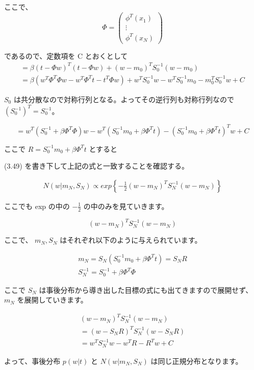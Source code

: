 \documentclass{jsarticle}
\begin{document}
ここで、
\[
    \Phi = \left( \begin{array}{c}
        \phi^T(x_1) \\
        \vdots\\
        \phi^T(x_N)
        \end{array} \right)
    \]

であるので、定数項を C とおくとして
\begin{align*}
    = \beta (t - \Phi w)^T(t - \Phi w) + (w - m_0)^TS_0^{-1}(w - m_0)\\
    = \beta ( w^T\Phi^T\Phi w - w^T\Phi^Tt - t^T\Phi w ) + w^TS_0^{-1}w - w^TS_0^{-1}m_0 - m_0^TS_0^{-1}w + C
\end{align*}

$S_0$ は共分散なので対称行列となる。よってその逆行列も対称行列なので $(S_0^{-1})^T = S_0^{-1}$。

\[
    = w^T(S_0^{-1} + \beta \Phi^T\Phi)w - w^T(S_0^{-1}m_0 + \beta \Phi^T t) - (S_0^{-1}m_0 + \beta \Phi^T t)^Tw + C
\]

ここで $R = S_0^{-1} m_0 + \beta \Phi^Tt$ とすると

(3.49) を書き下して上記の式と一致することを確認する。

\begin{align*}
    N(w|m_N, S_N)
    \propto exp\left\{ -\frac{1}{2} (w - m_N)^T S_N^{-1} (w - m_N) \right\}
\end{align*}

ここでも exp の中の $-\frac{1}{2}$ の中のみを見ていきます。

\[
    (w - m_N)^T S_N^{-1} (w - m_N)
    \]

ここで、 $m_N, S_N$ はそれぞれ以下のように与えられています。

\begin{align*}
    m_N = S_N(S_0^{-1} m_0 + \beta \Phi^Tt) = S_NR\\
    S_N^{-1} = S_0^{-1} + \beta \Phi^T \Phi
\end{align*}

ここで $S_N$ は事後分布から導き出した目標の式にも出てきますので展開せず、 $m_N$ を展開していきます。

\begin{align*}
    (w - m_N)^T S_N^{-1} (w - m_N)\\
    = (w - S_NR)^T S_N^{-1} (w - S_NR)\\
    = w^T S_N^{-1} w - w^T R - R^Tw + C
\end{align*}

よって、事後分布 $p(w|t)$ と $N(w|m_N, S_N)$ は同じ正規分布となります。
\end{document}
